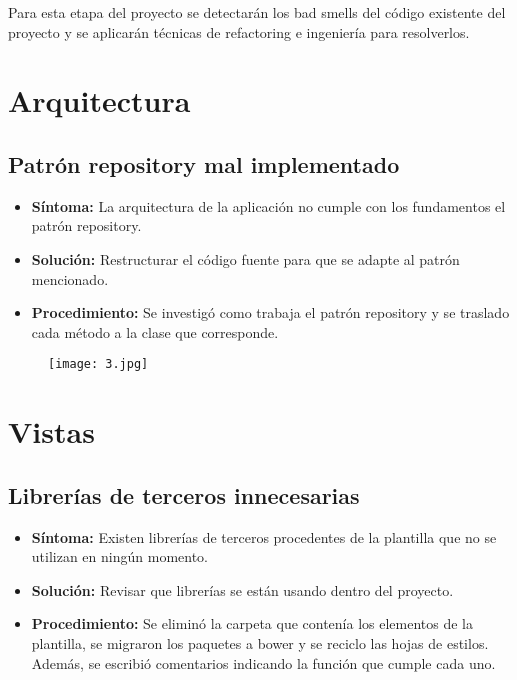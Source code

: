 Para esta etapa del proyecto se detectarán los bad smells del código existente del proyecto y se aplicarán técnicas de refactoring e ingeniería para resolverlos.

\section{Arquitectura}
\subsection{Patrón repository mal implementado}
\begin{itemize}
	\item \textbf{Síntoma:} La arquitectura de la aplicación no cumple con los fundamentos el patrón repository.
	\item \textbf{Solución:} Restructurar el código fuente para que se adapte al patrón mencionado.
	\item \textbf{Procedimiento:} Se investigó como trabaja el patrón repository y se traslado cada método a la clase que corresponde.
\end{itemize}

\begin{figure}[h]
	\texttt{[image: 3.jpg]}
	\centering
\end{figure}

\section{Vistas}
\subsection{Librerías de terceros innecesarias}
\begin{itemize}
	\item \textbf{Síntoma:} Existen librerías de terceros procedentes de la plantilla que no se utilizan en ningún momento.
	\item \textbf{Solución:} Revisar que librerías se están usando dentro del proyecto. 
	\item \textbf{Procedimiento:} Se eliminó la carpeta que contenía los elementos de la plantilla, se migraron los paquetes a bower y se reciclo las hojas de estilos. Además, se escribió comentarios indicando la función que cumple cada uno.
\end{itemize}

